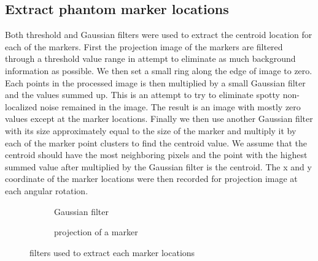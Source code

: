 \subsection{Extract phantom marker locations}
Both threshold and Gaussian filters were used to extract the centroid location for each of the markers.  First the projection image of the markers are filtered through a threshold value range in attempt to eliminate as much background information as possible.  We then set a small ring along the edge of image to zero.  Each points in the processed image is then multiplied by a small Gaussian filter and the values summed up.  This is an attempt to try to eliminate spotty non-localized noise remained in the image.  The result is an image with mostly zero values except at the marker locations.  Finally we then use another Gaussian filter with its size approximately equal to the size of the marker and multiply it by each of the marker point clusters to find the centroid value.  We assume that the centroid should have the most neighboring pixels and the point with the highest summed value after multiplied by the Gaussian filter is the centroid.  The x and y coordinate of the marker locations were then recorded for projection image at each angular rotation.

\begin{figure}
	\centering
	\begin{subfigure}[b]{0.3\linewidth}
	\centering
	\label{fig:GaussianFilter}
	\caption{Gaussian filter}
	\end{subfigure}
\hspace{0.2cm}
	\begin{subfigure}[b]{0.3\linewidth}
	\centering
	\label{fig:markercluster}
	\caption{projection of a marker}
	\end{subfigure}
\label{fig:extractmarkerlocation}
\caption{filters used to extract each marker locations}
\end{figure}

